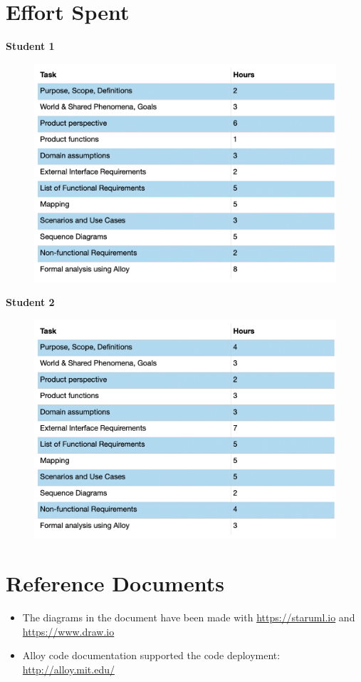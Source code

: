 \documentclass{article}
\begin{document}
\section{Effort Spent}

\textbf{Student 1}

\begin{figure}[H]
  \includegraphics[width=\linewidth]{PolidoriEffort.png}
  
\end{figure}

\textbf{Student 2}

\begin{figure}[H]
  \includegraphics[width=\linewidth]{RiveraEffort.png}
  
\end{figure}


\section{Reference Documents}
\begin{itemize}
\item The diagrams in the document have been made with \url{https://staruml.io} and \url{https://www.draw.io}
\item Alloy code documentation supported the code deployment: \url{http://alloy.mit.edu/}
\end{itemize}
\end{document}
